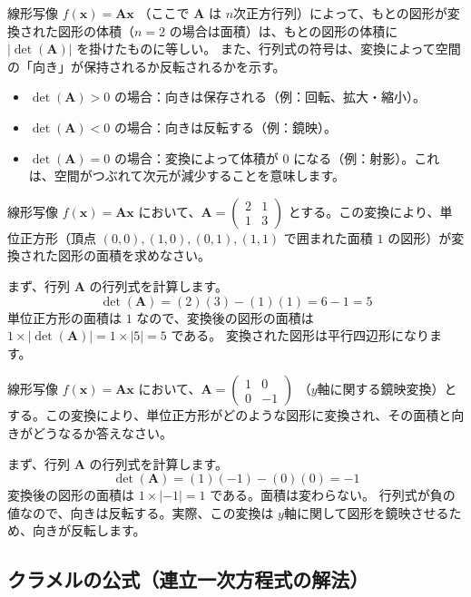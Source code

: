 \begin{thm}[行列式の幾何学的意味]
線形写像 $f(\bm{x}) = \bm{A}\bm{x}$ （ここで $\bm{A}$ は $n$次正方行列）によって、もとの図形が変換された図形の体積（$n=2$ の場合は面積）は、もとの図形の体積に $|\det(\bm{A})|$ を掛けたものに等しい。
また、行列式の符号は、変換によって空間の「向き」が保持されるか反転されるかを示す。
\begin{itemize}
    \item $\det(\bm{A}) > 0$ の場合：向きは保存される（例：回転、拡大・縮小）。
    \item $\det(\bm{A}) < 0$ の場合：向きは反転する（例：鏡映）。
    \item $\det(\bm{A}) = 0$ の場合：変換によって体積が $0$ になる（例：射影）。これは、空間がつぶれて次元が減少することを意味します。
\end{itemize}
\end{thm}

\begin{ex}
線形写像 $f(\bm{x}) = \bm{A}\bm{x}$ において、$\bm{A} = \begin{pmatrix} 2 & 1 \\ 1 & 3 \end{pmatrix}$ とする。この変換により、単位正方形（頂点 $(0,0), (1,0), (0,1), (1,1)$ で囲まれた面積 $1$ の図形）が変換された図形の面積を求めなさい。

まず、行列 $\bm{A}$ の行列式を計算します。
\[ \det(\bm{A}) = (2)(3) - (1)(1) = 6 - 1 = 5 \]
単位正方形の面積は $1$ なので、変換後の図形の面積は $1 \times |\det(\bm{A})| = 1 \times |5| = 5$ である。
変換された図形は平行四辺形になります。
\end{ex}

\begin{ex}
線形写像 $f(\bm{x}) = \bm{A}\bm{x}$ において、$\bm{A} = \begin{pmatrix} 1 & 0 \\ 0 & -1 \end{pmatrix}$ （$y$軸に関する鏡映変換）とする。この変換により、単位正方形がどのような図形に変換され、その面積と向きがどうなるか答えなさい。

まず、行列 $\bm{A}$ の行列式を計算します。
\[ \det(\bm{A}) = (1)(-1) - (0)(0) = -1 \]
変換後の図形の面積は $1 \times |-1| = 1$ である。面積は変わらない。
行列式が負の値なので、向きは反転する。実際、この変換は $y$軸に関して図形を鏡映させるため、向きが反転します。
\end{ex}

\subsection{クラメルの公式（連立一次方程式の解法）}

